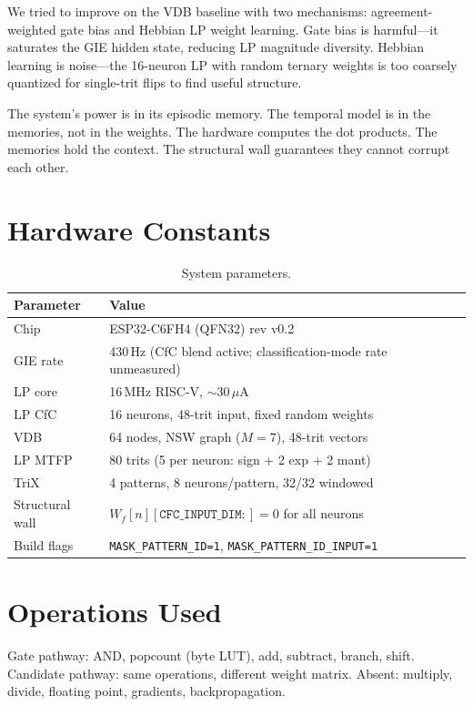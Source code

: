 \documentclass[11pt,letterpaper]{article}
\begin{document}
We tried to improve on the VDB baseline with two mechanisms: agreement-weighted gate bias and Hebbian LP weight learning. Gate bias is harmful---it saturates the GIE hidden state, reducing LP magnitude diversity. Hebbian learning is noise---the 16-neuron LP with random ternary weights is too coarsely quantized for single-trit flips to find useful structure.

The system's power is in its episodic memory. The temporal model is in the memories, not in the weights. The hardware computes the dot products. The memories hold the context. The structural wall guarantees they cannot corrupt each other.

\appendix

\section{Hardware Constants}

\begin{table}[h]
\centering
\begin{tabular}{ll}
\toprule
Parameter & Value \\
\midrule
Chip & ESP32-C6FH4 (QFN32) rev v0.2 \\
GIE rate & 430\,Hz (CfC blend active; classification-mode rate unmeasured) \\
LP core & 16\,MHz RISC-V, $\sim$30\,$\mu$A \\
LP CfC & 16 neurons, 48-trit input, fixed random weights \\
VDB & 64 nodes, NSW graph ($M=7$), 48-trit vectors \\
LP MTFP & 80 trits (5 per neuron: sign + 2 exp + 2 mant) \\
TriX & 4 patterns, 8 neurons/pattern, 32/32 windowed \\
Structural wall & $W_f[n][\texttt{CFC\_INPUT\_DIM}:] = 0$ for all neurons \\
Build flags & \texttt{MASK\_PATTERN\_ID=1}, \texttt{MASK\_PATTERN\_ID\_INPUT=1} \\
\bottomrule
\end{tabular}
\caption{System parameters.}
\end{table}

\section{Operations Used}

Gate pathway: AND, popcount (byte LUT), add, subtract, branch, shift. Candidate pathway: same operations, different weight matrix. Absent: multiply, divide, floating point, gradients, backpropagation.
\end{document}

